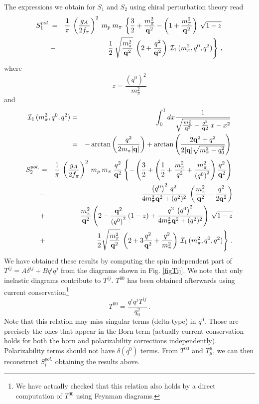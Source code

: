 \documentclass[a4paper,12pt]{article}
\newcommand{\be}{\begin{equation}}
\newcommand{\ee}{\end{equation}}
\newcommand{\bea}{\begin{eqnarray}}
\newcommand{\eea}{\end{eqnarray}}
\newcommand{\nn}{\nonumber}
\begin{document}
The expressions we obtain for $S_1$ and $S_2$ using chiral perturbation theory read
\bea
\label{S1pol}
{S}_{1}^{pol.}&=&\frac{1}{\pi}\:\left(\frac{g_{A}}{2f_{\pi}}\right)^2\:m_{p}\:m_{\pi}\:\left\{\frac{3}{2}+\frac{m_{\pi}^2}{{\bf q}^2}-\left(1+\frac{m_{\pi}^2}{{\bf q}^2}\right)\:\sqrt{1-z}\right.\\
&-&\left.\frac{1}{2}\:\sqrt{\frac{m_{\pi}^2}{{\bf q}^2}}\:\left(2+\frac{q^2}{{\bf q}^2}\right)\:\mathcal{I}_{1}\,(m_{\pi}^2,q^{0},q^2)\right\}\nonumber
\,,
\eea
where
\be
z=\frac{(q^{0})^2}{m_{\pi}^2}
\ee
and
\bea\label{eq:integraldef1}
\mathcal{I}_{1}\,(m_{\pi}^2,q^{0},q^2)
&=&\:\int_{0}^{1}dx\frac{1}{\sqrt{\frac{m_{\pi}^{2}}{{\bf q}^{2}}-\frac{q^{2}}{{\bf q}{2}}\:x-x^{2}}}
\\&=&
-\arctan\left(\frac{q^2}{2m_{\pi}|{\bf q}|}\right)
+\arctan\left(\frac{2{\bf q}^2+q^2}{2|{\bf q}|\sqrt{m_{\pi}^2-q_0^2}}\right)
\nn
\eea
\bea
\label{S2pol}
{S}_{2}^{pol.}&=&\frac{1}{\pi}\:\left(\frac{g_{A}}{2f_{\pi}}\right)^2\:m_{p}\:m_{\pi}\:
\frac{q^2}{{\bf q}^2}
\left\{-\left(\frac{3}{2}+\left(\frac{1}{2}+\frac{m_{\pi}^{2}}{q^{2}}
+\frac{m_{\pi}^{2}}{\left(q^{0}\right)^{2}}\right)\frac{q^{2}}{{\bf q}^{2}}\right)\right.\nonumber\\
&-&\frac{\left(q^{0}\right)^{2}\:q^{2}}{4m_{\pi}^{2}{\bf q}^{2}+(q^{2})^{2}}\:\left(\frac{m_{\pi}^2}{{\bf q}^2}-\frac{{ q}^2}{2{\bf q}^2}\right)\\
&+&\frac{m_{\pi}^{2}}{{\bf q}^{2}}\left(2-\frac{{\bf q}^{2}}{ \left(q^{0}\right)^{2}}\left(1-z\right)+\frac{q^{2}\:\left(q^{0}\right)^{2}}{4m_{\pi}^{2}{\bf q}^{2}+(q^{2})^{2}}\right)\:\sqrt{1-z}\nonumber\\
&+&\left.\frac{1}{2}\sqrt{\frac{m_{\pi}^{2}}{{\bf q}^{2}}}\:\left(2+3\frac{q^{2}}{{\bf q}^{2}}+\frac{q^{2}}{m_{\pi}^{2}}\right)\:\mathcal{I}_{1}\,(m_{\pi}^2,q^{0},q^2)\right\}\nonumber
\,.
\eea
We have obtained these results by computing the spin independent part of 
$T^{ij}=A\delta^{ij}+Bq^iq^j$ from the diagrams shown in Fig. \ref{figTij}. 
We note that only inelastic diagrams contribute to $T^{ij}$. 
$ T^{00}$ has 
been obtained afterwards using current conservation\footnote{We have actually checked that 
this relation also holds by a direct computation of $T^{00}$ using Feynman diagrams.} 
\be
\label{currcons}
T^{00}=\frac{q^iq^jT^{ij}}{q_0^2}
\,.
\ee
Note that this relation may miss singular terms (delta-type) in $q^0$. 
Those are precisely the ones that appear in the Born term (actually current 
conservation holds for both the born and polarizability corrections 
independently). Polarizability terms should not have $\delta(q^0)$ terms. 
From $T^{00}$ and $T^{\mu}_{\mu}$, we can then reconstruct $S_i^{pol.}$ 
obtaining the results above. 
\end{document}
